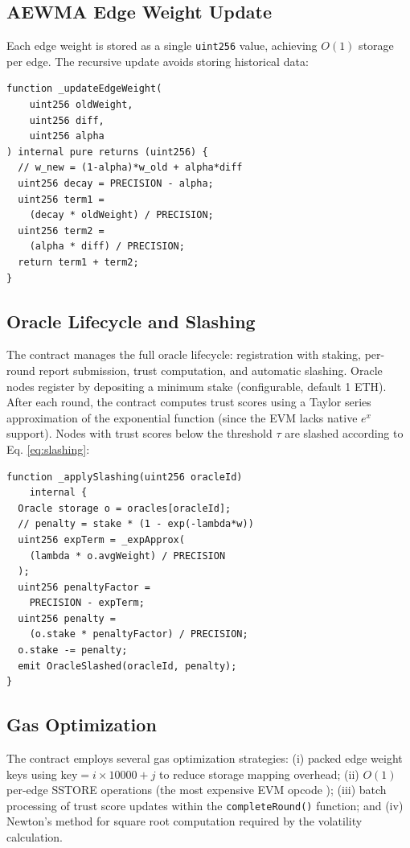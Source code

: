 \documentclass{ieeeaccess}
\begin{document}
\subsection{AEWMA Edge Weight Update}
Each edge weight is stored as a single \texttt{uint256} value, achieving $O(1)$ storage per edge. The recursive update avoids storing historical data:
\begin{lstlisting}
function _updateEdgeWeight(
    uint256 oldWeight,
    uint256 diff,
    uint256 alpha
) internal pure returns (uint256) {
  // w_new = (1-alpha)*w_old + alpha*diff
  uint256 decay = PRECISION - alpha;
  uint256 term1 =
    (decay * oldWeight) / PRECISION;
  uint256 term2 =
    (alpha * diff) / PRECISION;
  return term1 + term2;
}
\end{lstlisting}

\subsection{Oracle Lifecycle and Slashing}
The contract manages the full oracle lifecycle: registration with staking, per-round report submission, trust computation, and automatic slashing. Oracle nodes register by depositing a minimum stake (configurable, default 1 ETH). After each round, the contract computes trust scores using a Taylor series approximation of the exponential function (since the EVM lacks native $e^x$ support). Nodes with trust scores below the threshold $\tau$ are slashed according to Eq. \ref{eq:slashing}:
\begin{lstlisting}
function _applySlashing(uint256 oracleId)
    internal {
  Oracle storage o = oracles[oracleId];
  // penalty = stake * (1 - exp(-lambda*w))
  uint256 expTerm = _expApprox(
    (lambda * o.avgWeight) / PRECISION
  );
  uint256 penaltyFactor =
    PRECISION - expTerm;
  uint256 penalty =
    (o.stake * penaltyFactor) / PRECISION;
  o.stake -= penalty;
  emit OracleSlashed(oracleId, penalty);
}
\end{lstlisting}

\subsection{Gas Optimization}
The contract employs several gas optimization strategies: (i) packed edge weight keys using $\text{key} = i \times 10000 + j$ to reduce storage mapping overhead; (ii) $O(1)$ per-edge SSTORE operations (the most expensive EVM opcode \cite{b16}); (iii) batch processing of trust score updates within the \texttt{completeRound()} function; and (iv) Newton's method for square root computation required by the volatility calculation.
\end{document}
